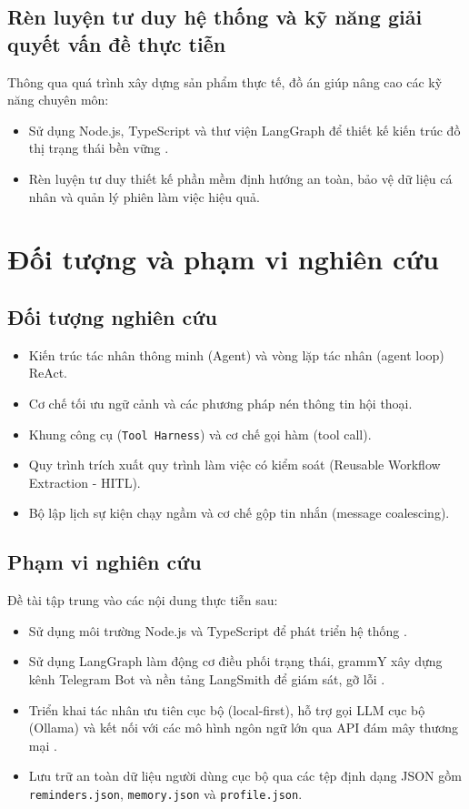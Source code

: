\subsection{Rèn luyện tư duy hệ thống và kỹ năng giải quyết vấn đề thực tiễn}
Thông qua quá trình xây dựng sản phẩm thực tế, đồ án giúp nâng cao các kỹ năng chuyên môn:
\begin{itemize}
  \item Sử dụng Node.js, TypeScript và thư viện LangGraph để thiết kế kiến trúc đồ thị trạng thái bền vững \cite{nodejsDocs,typescriptDocs,langgraphDocs}.
  \item Rèn luyện tư duy thiết kế phần mềm định hướng an toàn, bảo vệ dữ liệu cá nhân và quản lý phiên làm việc hiệu quả.
\end{itemize}

\section{Đối tượng và phạm vi nghiên cứu}

\subsection{Đối tượng nghiên cứu}
\begin{itemize}
  \item Kiến trúc tác nhân thông minh (Agent) và vòng lặp tác nhân (agent loop) ReAct.
  \item Cơ chế tối ưu ngữ cảnh và các phương pháp nén thông tin hội thoại.
  \item Khung công cụ (\texttt{Tool Harness}) và cơ chế gọi hàm (tool call).
  \item Quy trình trích xuất quy trình làm việc có kiểm soát (Reusable Workflow Extraction - HITL).
  \item Bộ lập lịch sự kiện chạy ngầm và cơ chế gộp tin nhắn (message coalescing).
\end{itemize}

\subsection{Phạm vi nghiên cứu}
Đề tài tập trung vào các nội dung thực tiễn sau:
\begin{itemize}
  \item Sử dụng môi trường Node.js và TypeScript để phát triển hệ thống \cite{nodejsDocs,typescriptDocs}.
  \item Sử dụng LangGraph làm động cơ điều phối trạng thái, grammY xây dựng kênh Telegram Bot và nền tảng LangSmith để giám sát, gỡ lỗi \cite{langgraphDocs,grammyDocs,langsmithDocs}.
  \item Triển khai tác nhân ưu tiên cục bộ (local-first), hỗ trợ gọi LLM cục bộ (Ollama) và kết nối với các mô hình ngôn ngữ lớn qua API đám mây thương mại \cite{ollamaDocs}.
  \item Lưu trữ an toàn dữ liệu người dùng cục bộ qua các tệp định dạng JSON gồm \texttt{reminders.json}, \texttt{memory.json} và \texttt{profile.json}.
\end{itemize}

